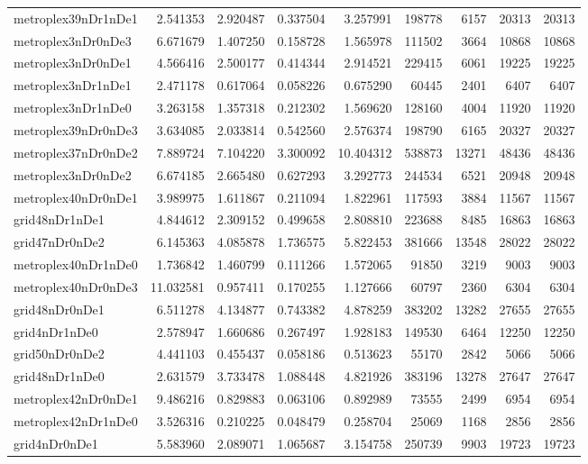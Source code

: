 \begin{longtable}{|l|r|r|r|r|r|r|r|r|}
metroplex39nDr1nDe1 & 2.541353 & 2.920487 & 0.337504 & 3.257991 & 198778 & 6157 & 20313 & 20313 \\
metroplex3nDr0nDe3 & 6.671679 & 1.407250 & 0.158728 & 1.565978 & 111502 & 3664 & 10868 & 10868 \\
metroplex3nDr0nDe1 & 4.566416 & 2.500177 & 0.414344 & 2.914521 & 229415 & 6061 & 19225 & 19225 \\
metroplex3nDr1nDe1 & 2.471178 & 0.617064 & 0.058226 & 0.675290 & 60445 & 2401 & 6407 & 6407 \\
metroplex3nDr1nDe0 & 3.263158 & 1.357318 & 0.212302 & 1.569620 & 128160 & 4004 & 11920 & 11920 \\
metroplex39nDr0nDe3 & 3.634085 & 2.033814 & 0.542560 & 2.576374 & 198790 & 6165 & 20327 & 20327 \\
metroplex37nDr0nDe2 & 7.889724 & 7.104220 & 3.300092 & 10.404312 & 538873 & 13271 & 48436 & 48436 \\
metroplex3nDr0nDe2 & 6.674185 & 2.665480 & 0.627293 & 3.292773 & 244534 & 6521 & 20948 & 20948 \\
metroplex40nDr0nDe1 & 3.989975 & 1.611867 & 0.211094 & 1.822961 & 117593 & 3884 & 11567 & 11567 \\
grid48nDr1nDe1 & 4.844612 & 2.309152 & 0.499658 & 2.808810 & 223688 & 8485 & 16863 & 16863 \\
grid47nDr0nDe2 & 6.145363 & 4.085878 & 1.736575 & 5.822453 & 381666 & 13548 & 28022 & 28022 \\
metroplex40nDr1nDe0 & 1.736842 & 1.460799 & 0.111266 & 1.572065 & 91850 & 3219 & 9003 & 9003 \\
metroplex40nDr0nDe3 & 11.032581 & 0.957411 & 0.170255 & 1.127666 & 60797 & 2360 & 6304 & 6304 \\
grid48nDr0nDe1 & 6.511278 & 4.134877 & 0.743382 & 4.878259 & 383202 & 13282 & 27655 & 27655 \\
grid4nDr1nDe0 & 2.578947 & 1.660686 & 0.267497 & 1.928183 & 149530 & 6464 & 12250 & 12250 \\
grid50nDr0nDe2 & 4.441103 & 0.455437 & 0.058186 & 0.513623 & 55170 & 2842 & 5066 & 5066 \\
grid48nDr1nDe0 & 2.631579 & 3.733478 & 1.088448 & 4.821926 & 383196 & 13278 & 27647 & 27647 \\
metroplex42nDr0nDe1 & 9.486216 & 0.829883 & 0.063106 & 0.892989 & 73555 & 2499 & 6954 & 6954 \\
metroplex42nDr1nDe0 & 3.526316 & 0.210225 & 0.048479 & 0.258704 & 25069 & 1168 & 2856 & 2856 \\
grid4nDr0nDe1 & 5.583960 & 2.089071 & 1.065687 & 3.154758 & 250739 & 9903 & 19723 & 19723 \\

\end{longtable}

